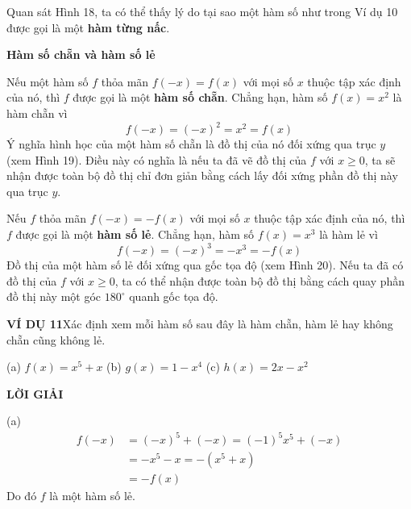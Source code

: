 \begin{minipage}[t]{0.708\textwidth}
    \fontsize{8.8pt}{11.5pt}\selectfont
    Quan sát Hình 18, ta có thể thấy lý do tại sao một hàm số như trong Ví dụ 10 được gọi là một \textbf{hàm từng nấc}.

    \vspace{0.6\baselineskip}
    \noindent{\color{stewartcyan}\rule{1.1ex}{1.1ex}}\quad \textbf{\textsf{\large Hàm số chẵn và hàm số lẻ}}

    \vspace{0.3\baselineskip}
    Nếu một hàm số $f$ thỏa mãn $f(-x) = f(x)$ với mọi số $x$ thuộc tập xác định của nó, thì $f$ được gọi là một \textbf{hàm số chẵn}. Chẳng hạn, hàm số $f(x) = x^2$ là hàm chẵn vì
    \[
    f(-x) = (-x)^2 = x^2 = f(x)
    \]
    Ý nghĩa hình học của một hàm số chẵn là đồ thị của nó đối xứng qua trục $y$ (xem Hình 19). Điều này có nghĩa là nếu ta đã vẽ đồ thị của $f$ với $x \geqslant 0$, ta sẽ nhận được toàn bộ đồ thị chỉ đơn giản bằng cách lấy đối xứng phần đồ thị này qua trục $y$.

    Nếu $f$ thỏa mãn $f(-x) = -f(x)$ với mọi số $x$ thuộc tập xác định của nó, thì $f$ được gọi là một \textbf{hàm số lẻ}. Chẳng hạn, hàm số $f(x) = x^3$ là hàm lẻ vì
    \[
    f(-x) = (-x)^3 = -x^3 = -f(x)
    \]
    Đồ thị của một hàm số lẻ đối xứng qua gốc tọa độ (xem Hình 20). Nếu ta đã có đồ thị của $f$ với $x \geqslant 0$, ta có thể nhận được toàn bộ đồ thị bằng cách quay phần đồ thị này một góc $180^\circ$ quanh gốc tọa độ.

    \vspace{0.5\baselineskip}
    \noindent\textbf{\textsf{\color{stewartcyan}VÍ DỤ 11}}\quad Xác định xem mỗi hàm số sau đây là hàm chẵn, hàm lẻ hay không chẵn cũng không lẻ.

    \vspace{0.2\baselineskip}
    \noindent(a) $f(x) = x^5 + x$ \qquad\qquad (b) $g(x) = 1 - x^4$ \qquad\qquad (c) $h(x) = 2x - x^2$

    \vspace{0.3\baselineskip}
    \noindent\textbf{\textsf{\color{stewartcyan}LỜI GIẢI}}

    \vspace{0.1\baselineskip}
    \noindent(a)
    \[
    \begin{aligned}
    f(-x) &= (-x)^5 + (-x) = (-1)^5 x^5 + (-x) \\
    &= -x^5 - x = -(x^5 + x) \\
    &= -f(x)
    \end{aligned}
    \]
    Do đó $f$ là một hàm số lẻ.


\end{minipage}
